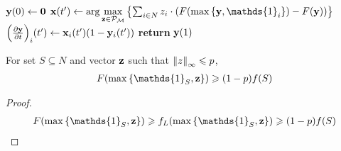 
\begin{algorithm}
	\caption{}\label{alg:measured_cont_greedy}
	\begin{algorithmic}[1]
		\State $\vb{y}(0) \gets \vb{0}$
		\State $\vb{x}(t') \gets \arg \max\limits_{\vb{z} \in \mathcal{P}_\mathcal{M}} \qty{\sum_{i \in N} z_i\cdot \qty( F\qty(\max\qty{\vb{y}, \mathds{1}_i})-F(\vb{y}))} $
		\State $\qty(\pdv{\vb{y}}{t})_i\qty(t') \gets \vb{x}_i(t') \qty(1-\vb{y}_i(t'))$
		\EndFor
		\State \textbf{return} $\vb{y}(1)$
		\EndProcedure
	\end{algorithmic}
\end{algorithm}

\begin{lemma} \label{bound_random}
	For set $S\subseteq N$ and vector $\vb{z}$ such that $\norm{z}_\infty \leqslant p$,
	\begin{align}
	F(\max\qty{\mathds{1}_S , \vb{z}}) \geqslant (1-p) f(S)
	\end{align}
	\begin{proof}
		\begin{align}
		F(\max\qty{\mathds{1}_S , \vb{z}}) \geqslant f_L(\max\qty{\mathds{1}_S , \vb{z}}) \geqslant (1-p)f(S)
		\end{align}
	\end{proof}
\end{lemma}
